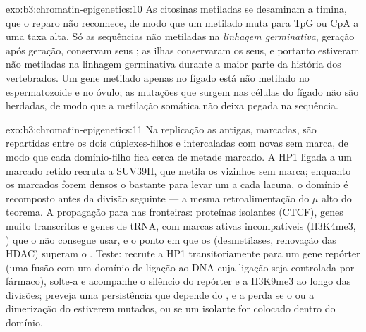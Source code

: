 \begin{solution}{exo:b3:chromatin-epigenetics:10}
As citosinas metiladas se desaminam a timina, que o reparo não
reconhece, de modo que um  metilado muta para TpG ou CpA a uma taxa
alta. Só as sequências não metiladas na \emph{linhagem germinativa},
geração após geração, conservam seus ; as ilhas conservaram os
seus, e portanto estiveram não metiladas na linhagem germinativa
durante a maior parte da história dos vertebrados. Um gene metilado
apenas no fígado está não metilado no espermatozoide e no óvulo; as
mutações que surgem nas células do fígado não são herdadas, de modo que
a metilação somática não deixa pegada na sequência.
\end{solution}

\begin{solution}{exo:b3:chromatin-epigenetics:11}
Na replicação as  antigas, marcadas, são repartidas entre os
dois dúplexes-filhos e intercaladas com  novas sem marca, de
modo que cada domínio-filho fica cerca de metade marcado. A HP1 ligada
a um  marcado retido recruta a SUV39H, que metila os
vizinhos sem marca; enquanto os  marcados forem densos o
bastante para levar um  a cada lacuna, o domínio é recomposto
antes da divisão seguinte --- a mesma retroalimentação do $\mu$ alto do
teorema. A propagação para nas fronteiras: proteínas isolantes (CTCF),
genes muito transcritos e genes de tRNA,  com marcas ativas
incompatíveis (H3K4me3, ) que o  não consegue usar, e
o ponto em que os  (desmetilases, renovação das HDAC)
superam o . Teste: recrute a HP1 transitoriamente para um gene
repórter (uma fusão com um domínio de ligação ao DNA cuja ligação seja
controlada por fármaco), solte-a e acompanhe o silêncio do repórter e a
H3K9me3 ao longo das divisões; preveja uma persistência que depende do
, e a perda se o  ou a dimerização do  estiverem
mutados, ou se um isolante for colocado dentro do domínio.
\end{solution}

